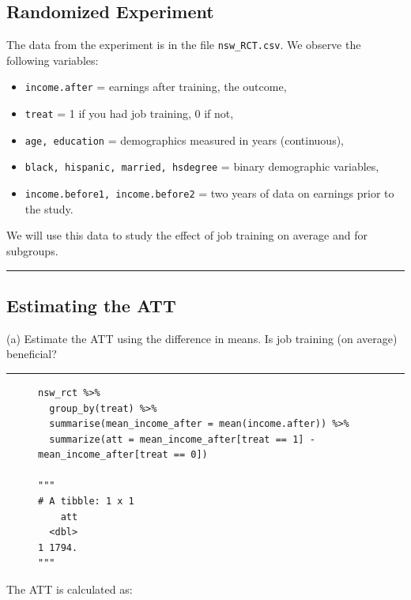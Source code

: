 \documentclass{article}
\newenvironment{colorparagraph}[1]{\par\color{#1}}{\par}
\begin{document}
\begin{colorparagraph}{questioncolor}
\label{q41}\subsection*{Randomized Experiment}
The data from the experiment is in the file \texttt{nsw\_RCT.csv}. We observe the following variables:

\begin{itemize}
  \item \texttt{income.after} = earnings after training, the outcome,
  \item \texttt{treat} = 1 if you had job training, 0 if not,
  \item \texttt{age, education} = demographics measured in years (continuous),
  \item \texttt{black, hispanic, married, hsdegree} = binary demographic variables,
  \item \texttt{income.before1, income.before2} = two years of data on earnings prior to the study.
\end{itemize}

We will use this data to study the effect of job training on average and for subgroups.

\rule{\textwidth}{0.5pt}
\end{colorparagraph}

\begin{colorparagraph}{questioncolor}
\label{q4a}\subsection{Estimating the ATT}
(a) Estimate the ATT using the difference in means. Is job training (on average) beneficial?

\rule{\textwidth}{0.5pt}
\end{colorparagraph}

\begin{figure}[H]
\centering
\begin{lstlisting}[style=Rstyle, caption=ATT]
nsw_rct %>% 
  group_by(treat) %>% 
  summarise(mean_income_after = mean(income.after)) %>% 
  summarize(att = mean_income_after[treat == 1] - mean_income_after[treat == 0])

"""
# A tibble: 1 x 1
    att
  <dbl>
1 1794.
"""
\end{lstlisting}
\end{figure}

The ATT is calculated as:
\end{document}
